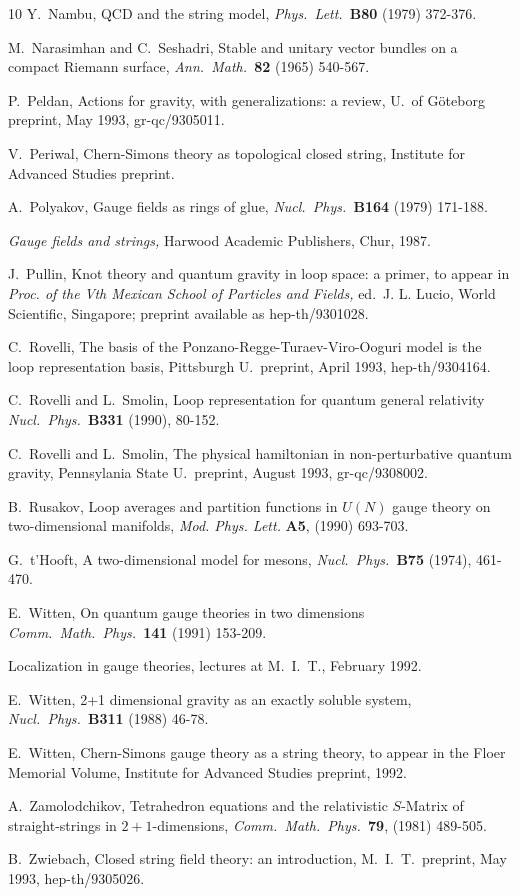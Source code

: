 \begin{thebibliography} {10}
 Y.\ Nambu, QCD and the string model, {\sl Phys.\ Lett.\
}{\bf B80} (1979) 372-376.

 M.\ Narasimhan and C.\ Seshadri, Stable and unitary vector
bundles on a compact Riemann surface, {\sl Ann.\ Math.\ }{\bf 82} (1965)
540-567.

 P.\ Peldan, Actions for gravity, with generalizations:
a review, U.\ of G\"oteborg preprint, May 1993, gr-qc/9305011.

 V.\ Periwal, Chern-Simons theory as topological closed
string, Institute for Advanced Studies preprint.

 A.\ Polyakov, Gauge fields as rings of glue, {\sl
Nucl.\ Phys.\ }{\bf  B164} (1979) 171-188.

{\sl Gauge fields and strings,} Harwood Academic Publishers, Chur, 1987.

  J.\ Pullin, Knot theory and quantum gravity in loop
space: a primer, to appear in {\sl Proc. of the Vth Mexican School of
Particles and Fields,} ed.\ J. L. Lucio, World Scientific, Singapore;
preprint available as hep-th/9301028.

 C.\ Rovelli, The basis of the
Ponzano-Regge-Turaev-Viro-Ooguri model is the loop representation basis,
Pittsburgh U.\ preprint, April 1993, hep-th/9304164.

  C.\ Rovelli and L.\ Smolin, Loop representation for
quantum general relativity {\sl Nucl.\ Phys.\ }{\bf B331} (1990),
80-152.

C.\ Rovelli and L.\ Smolin,
The physical hamiltonian in non-perturbative quantum gravity, Pennsylania
State U.\ preprint, August 1993, gr-qc/9308002.

  B.\ Rusakov, Loop averages and partition functions in
$U(N)$ gauge theory on two-dimensional manifolds, {\em Mod. Phys. Lett.}
{\bf A5}, (1990) 693-703.

 G.\ t'Hooft, A two-dimensional model for mesons, {\sl
Nucl.\ Phys.\ }{\bf B75} (1974), 461-470.

  E.\  Witten, On quantum gauge theories in two
dimensions {\sl Comm.\ Math.\ Phys.\ }{\bf 141} (1991) 153-209.

Localization in gauge theories, lectures at M.\ I.\ T., February 1992.

 E.\ Witten, 2+1 dimensional gravity as an exactly
soluble system, {\sl Nucl.\ Phys.\ }{\bf B311} (1988) 46-78.

 E.\ Witten, Chern-Simons gauge theory as a string theory,
to appear in the Floer Memorial Volume, Institute for Advanced
Studies preprint, 1992.

 A.\ Zamolodchikov, Tetrahedron equations and the
relativistic $S$-Matrix of straight-strings in $2+1$-dimensions,
{\sl Comm.\ Math.\ Phys.\ }{\bf 79}, (1981) 489-505.

 B.\ Zwiebach, Closed string field theory: an
introduction, M.\ I.\ T.\ preprint, May 1993, hep-th/9305026.

\end{thebibliography}




